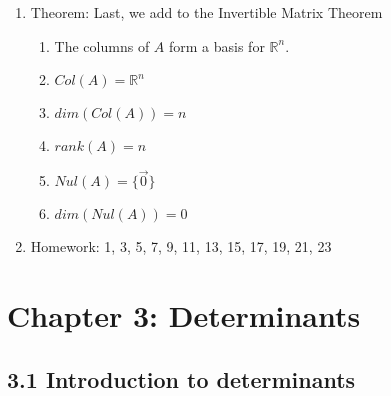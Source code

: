 \documentclass{article}
\begin{document}
\begin{enumerate}
\item Theorem: Last, we add to the Invertible Matrix Theorem
\begin{enumerate}
\item The columns of $A$ form a basis for $\mathbb{R}^n$.
\item $Col(A) = \mathbb{R}^n$
\item $dim(Col(A)) = n$
\item $rank(A)=n$
\item $Nul(A) = \{\vec{0} \}$
\item $dim(Nul(A)) = 0$
\end{enumerate}

\item Homework: 1, 3, 5, 7, 9, 11, 13, 15, 17, 19, 21, 23

\end{enumerate}

\section{Chapter 3: Determinants} 

\subsection{3.1 Introduction to determinants}
\end{document}
